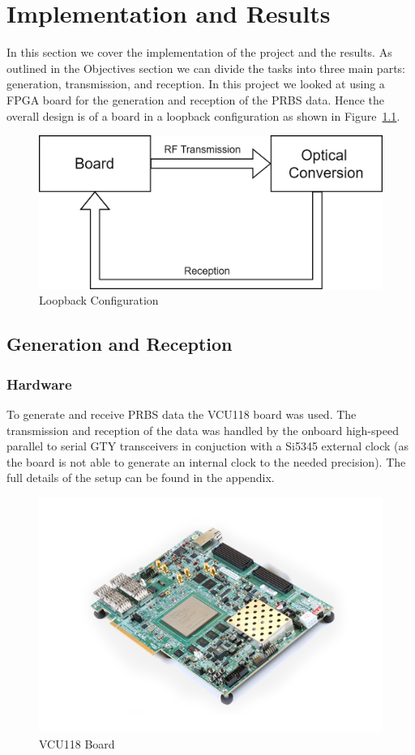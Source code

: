 \chapter{Implementation and Results}
In this section we cover the implementation of the project and the results.
As outlined in the Objectives section we can divide the tasks into three main
parts: generation, transmission, and reception. 
In this project we looked at using a FPGA board for the generation and
reception of the PRBS data.  Hence the overall design is of a board in a
loopback configuration as shown in Figure~\ref{fig:loopback}.

\begin{figure}[ht]
    \centering
    \includegraphics[width=0.6\linewidth]{img/loopback.png}
    \caption{Loopback Configuration}%
    \label{fig:loopback}
\end{figure}

\section{Generation and Reception}%
\label{sec:generation_and_reception}


\subsection{Hardware}%
\label{sub:hardware}
To generate and receive PRBS data the VCU118 board was used. The transmission
and reception of the data was handled by the onboard high-speed parallel to serial
GTY transceivers in conjuction with a Si5345 external clock (as the board is
not able to generate an internal clock to the needed precision).  The
full details of the setup can be found in the appendix.

\begin{figure}[ht]
    \centering
    \includegraphics[width=0.4\linewidth]{img/board.jpg}
    \caption{VCU118 Board}%
    \label{fig:board}
\end{figure}

